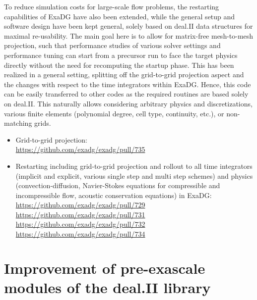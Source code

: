 \documentclass[a4paper,12pt]{article}
\begin{document}
To reduce simulation costs for large-scale flow problems, the restarting capabilities of ExaDG have also been extended, while the general setup and software design have been kept general, solely based on deal.II data structures for maximal re-usability. The main goal here is to allow for matrix-free mesh-to-mesh projection, such that performance studies of various solver settings and performance tuning can start from a precursor run to face the target physics directly without the need for recomputing the startup phase. This has been realized in a general setting, splitting off the grid-to-grid projection aspect and the changes with respect to the time integrators within ExaDG. Hence, this code can be easily transferred to other codes as the required routines are based solely on deal.II. This naturally allows considering arbitrary physics and discretizations, various finite elements (polynomial degree, cell type, continuity, etc.), or non-matching grids.
    \begin{itemize}
        \item Grid-to-grid projection:\\
        \href{https://github.com/exadg/exadg/pull/735}{https://github.com/exadg/exadg/pull/735}    
        \item Restarting including grid-to-grid projection and rollout to all time integrators (implicit and explicit, various single step and multi step schemes) and physics (convection-diffusion, Navier-Stokes equations for compressible and incompressible flow, acoustic conservation equations) in ExaDG:\\
        \href{https://github.com/exadg/exadg/pull/729}{https://github.com/exadg/exadg/pull/729}\\
        \href{https://github.com/exadg/exadg/pull/731}{https://github.com/exadg/exadg/pull/731}\\
        \href{https://github.com/exadg/exadg/pull/732}{https://github.com/exadg/exadg/pull/732}\\
        \href{https://github.com/exadg/exadg/pull/734}{https://github.com/exadg/exadg/pull/734}     
    \end{itemize}

\section{Improvement of pre-exascale modules of the deal.II library}
\end{document}
